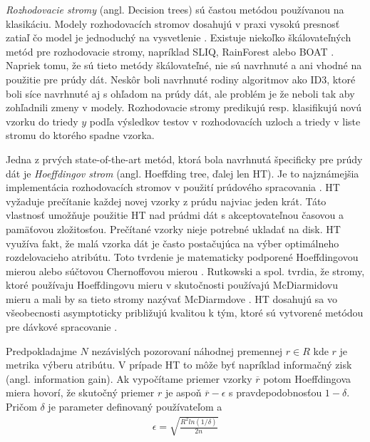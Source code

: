 \textit{Rozhodovacie stromy} (angl. Decision trees) sú častou metódou používanou na klasikáciu. Modely rozhodovacích stromov dosahujú v praxi vysokú presnosť zatiaľ čo model je jednoduchý na vysvetlenie \citep{jin2003efficient, hulten2001mining, domingos2000mining, aggarwal2014survey}. Existuje niekoľko škálovateľných metód pre rozhodovacie stromy, napríklad SLIQ, RainForest alebo BOAT \citep{aggarwal2014survey}. Napriek tomu, že sú tieto metódy škálovateľné, nie sú navrhnuté a ani vhodné na použitie pre prúdy dát. Neskôr boli navrhnuté rodiny algoritmov ako ID3, ktoré boli síce navrhnuté aj s ohľadom na prúdy dát, ale problém je že neboli tak aby  zohľadnili zmeny v modely. Rozhodovacie stromy predikujú resp. klasifikujú novú vzorku do triedy $y$ podľa výsledkov testov v rozhodovacích uzloch a triedy v liste stromu do ktorého spadne vzorka.
\par
Jedna z prvých state-of-the-art metód, ktorá bola navrhnutá špecificky pre prúdy dát je \textit{Hoeffdingov strom} (angl. Hoeffding tree, ďalej len HT).  Je to najznámejšia implementácia rozhodovacích stromov v použití prúdového spracovania \citep{domingos2000mining, aggarwal2014survey, nguyen2015survey}. HT vyžaduje prečítanie každej novej vzorky z prúdu najviac jeden krát. Táto vlastnosť umožňuje použitie HT nad prúdmi dát s akceptovateľnou časovou a pamäťovou zložitosťou. Prečítané vzorky nieje potrebné ukladať na disk. HT využíva fakt, že malá vzorka dát je často postačujúca na výber optimálneho rozdelovacieho atribútu. Toto tvrdenie je matematicky podporené Hoeffdingovou mierou alebo súčtovou Chernoffovou mierou \citep{domingos2000mining, han2011data}. Rutkowski a spol. tvrdia, že stromy, ktoré používaju Hoeffdingovu mieru v skutočnosti používajú McDiarmidovu mieru a mali by sa tieto stromy nazývať McDiarmdove \citep{rutkowski2013decision}. HT dosahujú sa vo všeobecnosti asymptoticky približujú kvalitou k tým, ktoré sú vytvorené metódou pre dávkové spracovanie \citep{hall2009weka}.
\par
Predpokladajme $N$ nezávislých pozorovaní náhodnej premennej $r \in R$ kde $r$ je metrika výberu atribútu. V prípade HT to môže byť napríklad informačný zisk (angl. information gain). Ak vypočítame priemer vzorky $\overline{r}$ potom Hoeffdingova miera hovorí, že skutočný priemer $r$ je aspoň $\overline{r}-\epsilon$ s pravdepodobnosťou $1-\delta$. Pričom $\delta$ je parameter definovaný používateľom a 
\begin{align*}
\epsilon = \sqrt{ \frac{R^2ln(1/\delta)} {2n} }
\end{align*}
